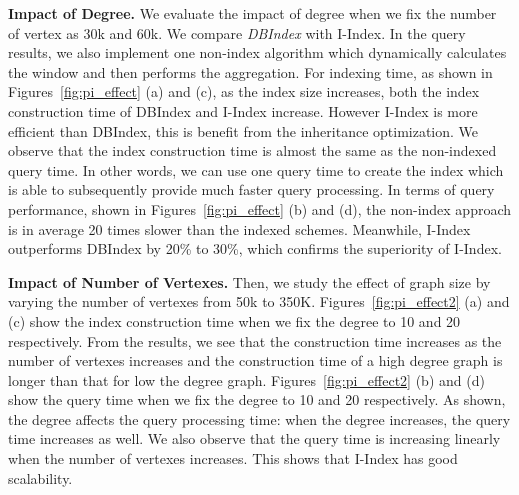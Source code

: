 \textbf{Impact of Degree.} We evaluate the impact of degree when we fix the number of vertex as 30k and 60k.  
We compare \emph{DBIndex} with I-Index. 
In the query results, we also implement one non-index algorithm 
which dynamically calculates the window and then performs the aggregation. 
For indexing time, as shown in Figures~\ref{fig:pi_effect} (a) and (c), as the 
index size increases, both the index construction time of 
DBIndex and I-Index increase. However I-Index is more efficient than 
DBIndex, this is benefit from the inheritance optimization.  We observe that the 
index construction time is almost the same as the non-indexed query time. In other words, 
we can use one query time to create the index which is able to subsequently provide much faster query processing. 
In terms of query performance, shown in Figures~\ref{fig:pi_effect} (b) and (d), the non-index approach is in average 20 times slower than 
the indexed schemes. Meanwhile, I-Index outperforms DBIndex by 20\% to 30\%, which confirms the superiority of I-Index.

\textbf{Impact of Number of Vertexes.} Then, we study 
the effect of graph size by varying the number of vertexes from 50k to 350K.
Figures~\ref{fig:pi_effect2} (a) and (c) show the index construction time when we fix the degree to 
10 and 20 respectively. From the results, we see that the construction time increases as the number of vertexes increases and the construction time of a high degree graph is longer than that for low the degree graph. Figures~\ref{fig:pi_effect2} (b) and (d) show the query time when we fix the degree to 10 and 20 respectively. 
As shown, the degree affects the query processing time: when the degree increases, the query time increases as well. We also observe that the query time is increasing linearly when the number of vertexes increases. This shows that I-Index has good scalability.
  
